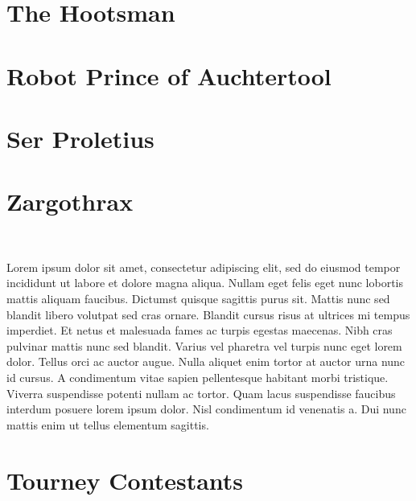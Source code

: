 \section*{The Hootsman}\label{char:Hootsman}%
%
\clearpage
\section*{Robot Prince of Auchtertool}\label{char:RobotPrinceOfAuchtertool}%
%
\clearpage
\section*{Ser Proletius}\label{char:SerProletius}%
%
\clearpage
\section*{Zargothrax}\label{char:Zargothrax}%
\vspace*{-2.4\fontdimen6\font}\hfill\\\begin{multicols}{2}%
	{\noindent\entryfont Lorem ipsum dolor sit amet, consectetur adipiscing elit, sed do eiusmod tempor incididunt ut labore et dolore magna aliqua. Nullam eget felis eget nunc lobortis mattis aliquam faucibus. Dictumst quisque sagittis purus sit. Mattis nunc sed blandit libero volutpat sed cras ornare. Blandit cursus risus at ultrices mi tempus imperdiet. Et netus et malesuada fames ac turpis egestas maecenas. Nibh cras pulvinar mattis nunc sed blandit. Varius vel pharetra vel turpis nunc eget lorem dolor. Tellus orci ac auctor augue. Nulla aliquet enim tortor at auctor urna nunc id cursus. A condimentum vitae sapien pellentesque habitant morbi tristique. Viverra suspendisse potenti nullam ac tortor. Quam lacus suspendisse faucibus interdum posuere lorem ipsum dolor. Nisl condimentum id venenatis a. Dui nunc mattis enim ut tellus elementum sagittis.}
\end{multicols}%
%
\twocolumn
\clearpage
\section*{Tourney Contestants}%
